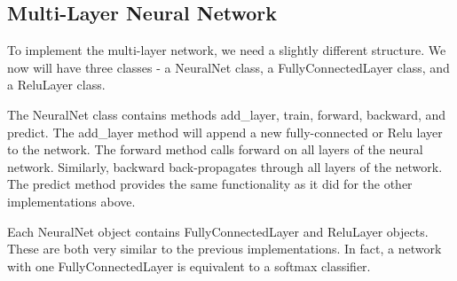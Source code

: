 \subsection{Multi-Layer Neural Network} To implement the multi-layer network,
we need a slightly different structure.  We now will have three classes - a
{\ttfamily NeuralNet} class, a {\ttfamily FullyConnectedLayer} class, and a
{\ttfamily ReluLayer} class.

The {\ttfamily NeuralNet} class contains methods {\ttfamily add\_layer},
{\ttfamily train}, {\ttfamily forward}, {\ttfamily backward}, and {\ttfamily
predict}. The {\ttfamily add\_layer} method will append a new fully-connected
or Relu layer to the network. The {\ttfamily forward} method calls {\ttfamily
forward} on all layers of the neural network. Similarly, {\ttfamily backward}
back-propagates through all layers of the network. The {\ttfamily predict}
method provides the same functionality as it did for the other implementations
above.

Each {\ttfamily NeuralNet} object contains {\ttfamily FullyConnectedLayer} and
{\ttfamily ReluLayer} objects. These are both very similar to the previous
implementations. In fact, a network with one {\ttfamily FullyConnectedLayer} is
equivalent to a softmax classifier.
